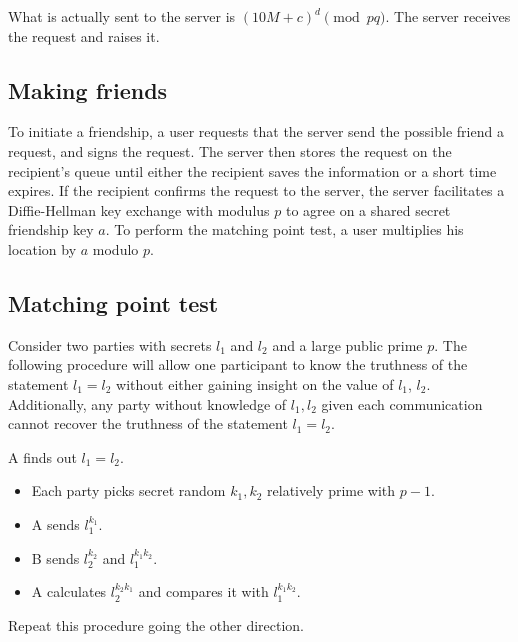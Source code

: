 \documentclass{article}
\begin{document}
What is actually sent to the server is $(10M + c)^d \pmod{pq}$. The server receives the request and raises it.

\subsection{Making friends}
To initiate a friendship, a user requests that the server send the possible friend a request, and signs the request. The server then stores the request on the recipient's queue until either the recipient saves the information or a short time expires. If the recipient confirms the request to the server, the server facilitates a Diffie-Hellman key exchange with modulus $p$ to agree on a shared secret friendship key $a$. To perform the matching point test, a user multiplies his location by $a$ modulo $p$.

\subsection{Matching point test}

Consider two parties with secrets $l_1$ and $l_2$ and a large public prime $p$.
The following procedure will allow one participant to know the truthness of the statement $l_1 = l_2$ without either gaining insight on the value of $l_1$, $l_2$. Additionally, any party without knowledge of $l_1, l_2$ given each communication cannot recover the truthness of the statement $l_1 = l_2$.

A finds out $l_1=l_2$.

\begin{itemize}
    \item Each party picks secret random $k_1, k_2$ relatively prime with $p-1$.
    
    \item A sends $l_1^{k_1}$.
    
    \item B sends $l_2^{k_2}$ and $l_1^{k_1 k_2}$.
    
    \item A calculates $l_2^{k_2 k_1}$ and compares it with $l_1^{k_1 k_2}$.
    
\end{itemize}

Repeat this procedure going the other direction.
\end{document}
